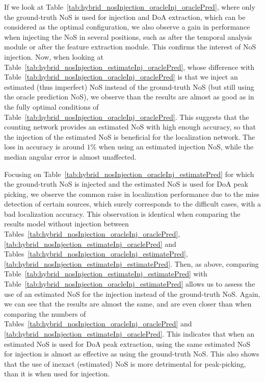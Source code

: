 If we look at Table~\ref{tab:hybrid_nosInjection_oracleInj_oraclePred}, where only the ground-truth NoS is used for injection and DoA extraction, which can be considered as the optimal configuration, we also observe a gain in performance when injecting the NoS in several positions, such as after the temporal analysis module or after the feature extraction module. This confirms the interest of NoS injection. Now, when looking at Table~\ref{tab:hybrid_nosInjection_estimateInj_oraclePred}, whose difference with Table~\ref{tab:hybrid_nosInjection_oracleInj_oraclePred} is that we inject an estimated (thus imperfect) NoS instead of the ground-truth NoS (but still using the oracle prediction NoS), we observe than the results are almost as good as in the fully optimal conditions of Table~\ref{tab:hybrid_nosInjection_oracleInj_oraclePred}. This suggests that the counting network provides an estimated NoS with high enough accuracy, so that the injection of the estimated NoS is beneficial for the localization network. The loss in accuracy is around $1$\% when using an estimated injection NoS, while the median angular error is almost unaffected.

Focusing on Table~\ref{tab:hybrid_nosInjection_oracleInj_estimatePred} for which the ground-truth NoS is injected and the estimated NoS is used for DoA peak picking, we observe the common raise in localization performance due to the miss detection of certain sources, which surely corresponds to the difficult cases, with a bad localization accuracy. This observation is identical when comparing the results model without injection between Tables~\ref{tab:hybrid_nosInjection_oracleInj_oraclePred}, \ref{tab:hybrid_nosInjection_estimateInj_oraclePred} and Tables~\ref{tab:hybrid_nosInjection_oracleInj_estimatePred}, \ref{tab:hybrid_nosInjection_estimateInj_estimatePred}. Then, as above, comparing Table~\ref{tab:hybrid_nosInjection_estimateInj_estimatePred} with Table~\ref{tab:hybrid_nosInjection_oracleInj_estimatePred} allows us to assess the use of an estimated NoS for the injection instead of the ground-truth NoS. Again, we can see that the results are almost the same, and are even closer than when comparing the numbers of Tables~\ref{tab:hybrid_nosInjection_oracleInj_oraclePred} and \ref{tab:hybrid_nosInjection_estimateInj_oraclePred}. This indicates that when an estimated NoS is used for DoA peak extraction, using the same estimated NoS for injection is almost as effective as using the ground-truth NoS. This also shows that the use of inexact (estimated) NoS is more detrimental for peak-picking, than it is when used for injection.

